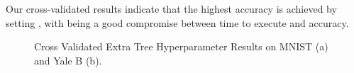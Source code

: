 Our cross-validated results indicate that the highest accuracy is achieved by setting , with  being a good compromise between time to execute and accuracy.
%
\begin{figure}[H]
    \centering
    \caption{Cross Validated Extra Tree Hyperparameter Results on MNIST (a) and Yale B (b).}
\end{figure}